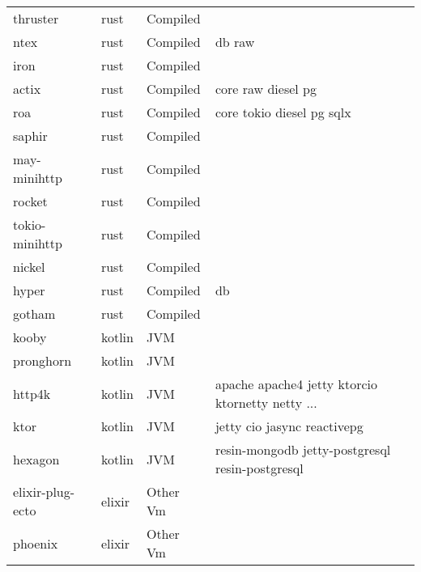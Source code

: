 \begin{longtable}{llll}
    thruster         & rust & Compiled        &                                                    \\
    ntex             & rust & Compiled        & db raw                                             \\
    iron             & rust & Compiled        &                                                    \\
    actix            & rust & Compiled        & core raw diesel pg                                 \\
    roa              & rust & Compiled        & core tokio diesel pg sqlx                          \\
    saphir           & rust & Compiled        &                                                    \\
    may-minihttp     & rust & Compiled        &                                                    \\
    rocket           & rust & Compiled        &                                                    \\
    tokio-minihttp   & rust & Compiled        &                                                    \\
    nickel           & rust & Compiled        &                                                    \\
    hyper            & rust & Compiled        & db                                                 \\
    gotham           & rust & Compiled        &                                                    \\
    kooby            & kotlin & JVM     &                                                    \\
    pronghorn        & kotlin & JVM     &                                                    \\
    http4k           & kotlin & JVM     & apache apache4 jetty ktorcio ktornetty netty ...   \\
    ktor             & kotlin & JVM     & jetty cio jasync reactivepg                        \\
    hexagon          & kotlin & JVM     & resin-mongodb jetty-postgresql resin-postgresql    \\
    elixir-plug-ecto & elixir & Other Vm     &                                                    \\
    phoenix          & elixir & Other Vm     &                                                    \\

\end{longtable}
